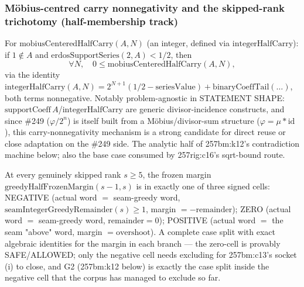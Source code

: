 \subsubsection*{M\"obius-centred carry nonnegativity and the skipped-rank trichotomy (half-membership track)}

\begin{thm}
For $\mathrm{mobiusCenteredHalfCarry}(A,N)$ (an integer, defined via $\mathrm{integerHalfCarry}$):
if $1\notin A$ and $\mathrm{erdosSupportSeries}(2,A) < 1/2$, then
\[
\forall N,\quad 0 \le \mathrm{mobiusCenteredHalfCarry}(A,N),
\]
via the identity $\mathrm{integerHalfCarry}(A,N) = 2^{N+1}(1/2-\mathrm{seriesValue}) +
\mathrm{binaryCoeffTail}(\dots)$, both terms nonnegative. Notably problem-agnostic in STATEMENT
SHAPE: $\mathrm{supportCoeff}\,A$/$\mathrm{integerHalfCarry}$ are generic divisor-incidence
constructs, and since \#249 ($\varphi/2^n$) is itself built from a M\"obius/divisor-sum
structure ($\varphi=\mu*\mathrm{id}$), this carry-nonnegativity mechanism is a strong candidate
for direct reuse or close adaptation on the \#249 side. The analytic half of 257bm:k12's
contradiction machine below; also the base case consumed by 257rig:c16's sqrt-bound route.
\par\noindent{}    
\end{thm}

\begin{thm}
At every genuinely skipped rank $s\ge5$, the frozen margin $\mathrm{greedyHalfFrozenMargin}(s-1,s)$
is in exactly one of three signed cells: NEGATIVE (actual word $=$ seam-greedy word,
$\mathrm{seamIntegerGreedyRemainder}(s)\ge1$, margin $=-\mathrm{remainder}$); ZERO (actual word
$=$ seam-greedy word, $\mathrm{remainder}=0$); POSITIVE (actual word $=$ the seam "above" word,
margin $=\mathrm{overshoot}$). A complete case split with exact algebraic identities for the
margin in each branch — the zero-cell is provably SAFE/ALLOWED; only the negative cell needs
excluding for 257bm:c13's socket (i) to close, and G2 (257bm:k12 below) is exactly the case
split inside the negative cell that the corpus has managed to exclude so far.
\par\noindent{}   
\end{thm}

